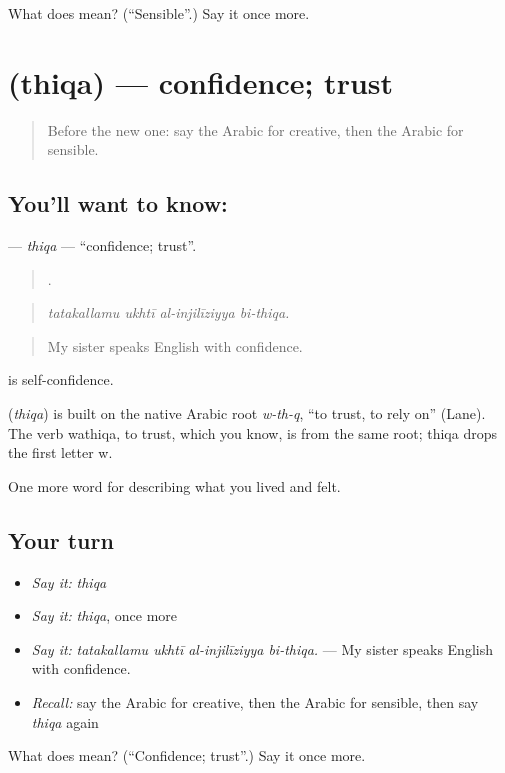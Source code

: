 \begin{tcolorbox}[breakable,colback=teal!4,colframe=teal!35!black,title={Before you move on}]
What does  mean? (\textquotedblleft{}Sensible\textquotedblright{}.) Say it once more.
\end{tcolorbox}
\section[\texorpdfstring{\ar{ثقة} (thiqa)}{ثقة (thiqa)}]{ (thiqa) — confidence; trust}

\label{lesson:AR-C501-thiqa}



\begin{quote}
Before the new one: say the Arabic for creative, then the Arabic for sensible.
\end{quote}

\subsection*{You'll want to know: }
\textbf{} — \emph{thiqa} — \textquotedblleft{}confidence; trust\textquotedblright{}.

\begin{quote}
   .
\end{quote}

\begin{quote}
\emph{tatakallamu ukhtī al-injilīziyya bi-thiqa.}
\end{quote}

\begin{quote}
My sister speaks English with confidence.
\end{quote}

  is self-confidence.

\begin{cousinweb}
\textbf{} (\emph{thiqa}) is built on the native Arabic root \emph{w-th-q}, \textquotedblleft{}to trust, to rely on\textquotedblright{} (Lane). The verb wathiqa, to trust, which you know, is from the same root; thiqa drops the first letter w.
\end{cousinweb}

\begin{grammarlens}[title={What you've built}]
One more word for describing what you lived and felt.
\end{grammarlens}

\subsection*{Your turn}
\begin{itemize}
\raggedright
  \item \emph{Say it:} \emph{thiqa}
  \item \emph{Say it:} \emph{thiqa}, once more
  \item \emph{Say it:} \emph{tatakallamu ukhtī al-injilīziyya bi-thiqa.} — My sister speaks English with confidence.
  \item \emph{Recall:} say the Arabic for creative, then the Arabic for sensible, then say \emph{thiqa} again
\end{itemize}

\begin{tcolorbox}[breakable,colback=teal!4,colframe=teal!35!black,title={Before you move on}]
What does  mean? (\textquotedblleft{}Confidence; trust\textquotedblright{}.) Say it once more.
\end{tcolorbox}
